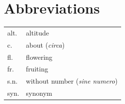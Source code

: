 \section*{Abbreviations}
\begin{tabular}{@{}ll@{}}
	alt.  & altitude \\
	c.    & about (\textit{circa}) \\
	fl.   & flowering \\
	fr.   & fruiting \\
	s.n.  & without number (\textit{sine numero}) \\
	syn.  & synonym \\
\end{tabular}